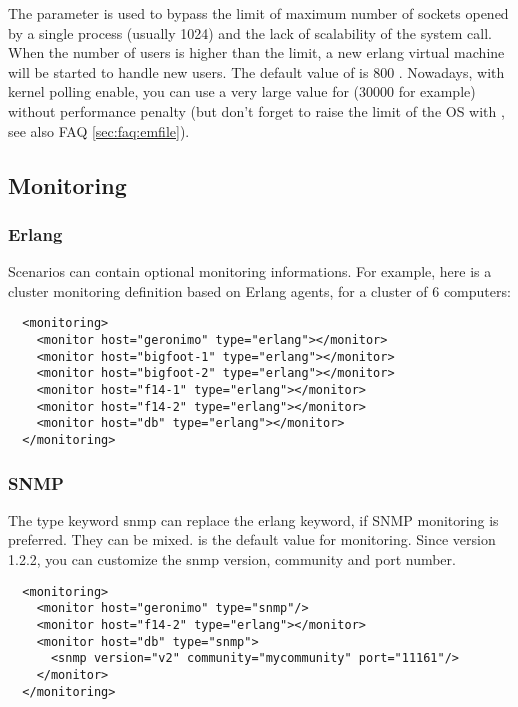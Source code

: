 \documentclass{IDXDOC-en}
\begin{document}
 The  parameter is used to bypass the limit of
 maximum number of sockets opened by a single process (usually 1024)
 and the lack of scalability of the  system call. When
 the number of users is higher than the limit, a new erlang virtual
 machine will be started to handle new users. The default value of
  is 800 . Nowadays, with kernel polling enable, you
 can use a very large value for  (30000 for example) without
 performance penalty (but don't forget to raise the limit of the OS with
 , see also FAQ \ref{sec:faq:emfile}).

\subsection{Monitoring}

\subsubsection{Erlang}

\par Scenarios can contain optional monitoring informations. For example,
here is a cluster monitoring definition based on Erlang agents, for
a cluster of 6 computers:

\begin{Verbatim}
  <monitoring>
    <monitor host="geronimo" type="erlang"></monitor>
    <monitor host="bigfoot-1" type="erlang"></monitor>
    <monitor host="bigfoot-2" type="erlang"></monitor>
    <monitor host="f14-1" type="erlang"></monitor>
    <monitor host="f14-2" type="erlang"></monitor>
    <monitor host="db" type="erlang"></monitor>
  </monitoring>
\end{Verbatim}

\subsubsection{SNMP}
The type keyword snmp can replace the erlang keyword, if SNMP monitoring
is preferred. They can be mixed.  is the default value for
monitoring. Since version 1.2.2, you can customize the snmp version,
community and port number.

\begin{Verbatim}
  <monitoring>
    <monitor host="geronimo" type="snmp"/>
    <monitor host="f14-2" type="erlang"></monitor>
    <monitor host="db" type="snmp">
      <snmp version="v2" community="mycommunity" port="11161"/>
    </monitor>
  </monitoring>
\end{Verbatim}
\end{document}
